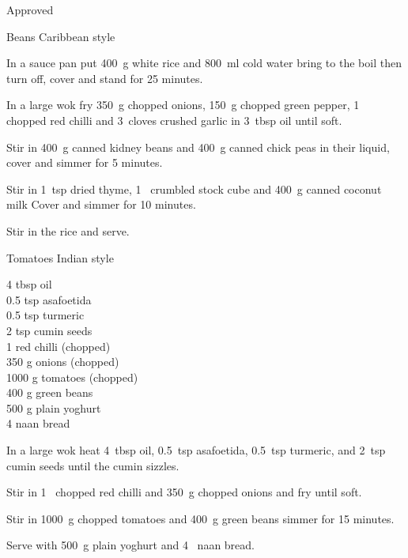 \begin{menu}{Approved}
\begin{recipe}{2}{Beans Caribbean style}
    \begin{instructions}
    \item 
      In a
      sauce pan
      put
      400~g  white rice
      and
      800~ml  cold water
      bring to the boil then turn off, cover and stand for 25 minutes.
    \item 
        In a large wok fry 
        350~g chopped onions,
        150~g chopped green pepper,
        1~ chopped red chilli
        and
        3~cloves crushed garlic
        in 
        3~tbsp  oil
        until soft.
      \item 
        Stir in
        400~g  canned kidney beans
        and
        400~g  canned chick peas
        in their liquid,
        cover and simmer for 5 minutes.
      \item 
        Stir in
        1~tsp  dried thyme,
        1~ crumbled stock cube
        and 
        400~g  canned coconut milk
        Cover and simmer for 10 minutes.
      \item 
        Stir in the rice and serve.
      
    \end{instructions}
    \end{recipe}%
  
    \begin{recipe}{2}{Tomatoes Indian style}%
    
		\begin{ingredients}
		4 tbsp oil  \\
	0.5 tsp asafoetida  \\
	0.5 tsp turmeric  \\
	2 tsp cumin seeds  \\
	1  red chilli (chopped) \\
	350 g onions (chopped) \\
	1000 g tomatoes (chopped) \\
	400 g green beans  \\
	500 g plain yoghurt  \\
	4  naan bread  \\
	
		\end{ingredients}
	
	
    \begin{instructions}
    \item 
        In a large wok heat
        4~tbsp  oil,
        0.5~tsp  asafoetida,
        0.5~tsp  turmeric,
        and
        2~tsp  cumin seeds
        until
        the cumin sizzles.
      \item 
        Stir in
        1~ chopped red chilli
        and
        350~g chopped onions
        and
        fry until soft.
      \item 
        Stir in
        1000~g chopped tomatoes
        and
        400~g  green beans
        simmer for 15 minutes.
      \item 
        Serve with 
        500~g  plain yoghurt
        and 
        4~  naan bread.
      

\end{instructions}
\end{recipe}
\end{menu}
